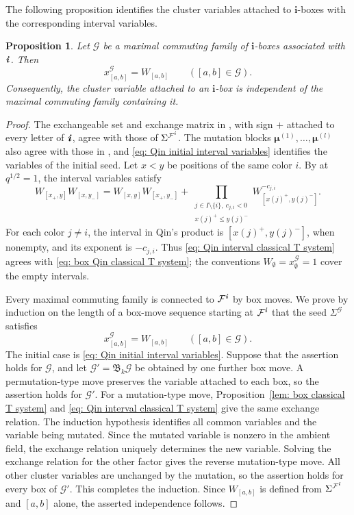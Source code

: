 \documentclass[12pt, leqno]{amsart}
\numberwithin{equation}{section}
\theoremstyle{plain}
\newtheorem{proposition}[lemma]{Proposition}
\theoremstyle{definition}
\renewcommand{\le}{\leqslant}
\newcommand{\ii}{ \textbf{\textit{i}}}
\newcommand{\frakB}{\mathfrak{B}}
\newcommand{\bmu}{{\boldsymbol{\mu}}}
\newcommand{\bfi}{\mathbf{i}}
\newcommand{\calF}{\mathcal{F}}
\newcommand{\calG}{\mathcal{G}}
\begin{document}
The following proposition identifies the cluster variables attached
to $\bfi$-boxes with the corresponding interval variables.

\begin{proposition}
\label{lem: Qin box interval identification}
Let $\calG$ be a maximal commuting family of $\bfi$-boxes associated
with $\ii$.  Then
\[
x^{\calG}_{[a,b]}=W_{[a,b]}
\qquad ([a,b]\in\calG).
\]
Consequently, the cluster variable attached to an $\bfi$-box is
independent of the maximal commuting family containing it.
\end{proposition}

\begin{proof}
The exchangeable set and exchange matrix in
\cite[Section~3.1, equation~(3.1)]{Qin24B}, with sign $+$ attached
to every letter of $\ii$, agree with those of $\Sigma^{\calF^\ii}$.
The mutation blocks $\bmu^{(1)},\ldots,\bmu^{(l)}$ also agree with
those in \cite[Section~3.3]{Qin24B}, and
\eqref{eq: Qin initial interval variables} identifies the variables
of the initial seed. Let $x<y$ be positions of the same color $i$.
By \cite[Proposition~8.6]{Qin24A} at $q^{1/2}=1$, the interval
variables satisfy
\begin{equation}
W_{[x_+,y]}W_{[x,y_-]}
=W_{[x,y]}W_{[x_+,y_-]}+
\prod_{\substack{j\in I\setminus\{i\},\ c_{j,i}<0\\ x(j)^+\le y(j)^-}}
W_{[x(j)^+,y(j)^-]}^{-c_{j,i}}.
\label{eq: Qin interval classical T system}
\end{equation}
For each color $j\ne i$, the interval in Qin's product is
$[x(j)^+,y(j)^-]$, when nonempty, and its exponent is $-c_{j,i}$.
Thus \eqref{eq: Qin interval classical T system} agrees with
\eqref{eq: box Qin classical T system}; the conventions
$W_\emptyset=x^\calG_\emptyset=1$ cover the empty intervals.

Every maximal commuting family is connected to $\calF^\ii$ by box
moves.  We prove by induction on the length of a box-move sequence
starting at $\calF^\ii$ that the seed $\Sigma^\calG$ satisfies
\[
x^\calG_{[a,b]}=W_{[a,b]}
\qquad ([a,b]\in\calG).
\]
The initial case is \eqref{eq: Qin initial interval variables}.
Suppose that the assertion holds for $\calG$, and let
$\calG'=\frakB_k\calG$ be obtained by one further box move.
A permutation-type move preserves the variable attached to each box,
so the assertion holds for $\calG'$.
For a mutation-type move, Proposition~\ref{lem: box classical T system}
and \eqref{eq: Qin interval classical T system} give the same exchange
relation. The induction hypothesis identifies all common variables
and the variable being mutated. Since the mutated variable is nonzero
in the ambient field, the exchange relation uniquely determines the
new variable. Solving the exchange relation for the other factor
gives the reverse mutation-type move.
All other cluster variables are unchanged by the mutation, so the
assertion holds for every box of $\calG'$.  This completes the
induction.
Since $W_{[a,b]}$ is defined from $\Sigma^{\calF^\ii}$ and $[a,b]$
alone, the asserted independence follows.
\end{proof}
\end{document}
